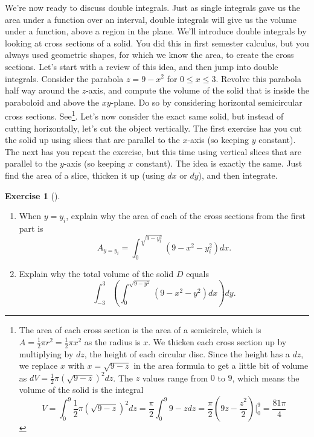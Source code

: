 \documentclass[10pt,]{book}
\theoremstyle{plain}
\theoremstyle{definition}
\theoremstyle{definition}
\theoremstyle{definition}
\theoremstyle{definition}
\newtheorem{exploration}[project]{Exercise}
\theoremstyle{definition}
\numberwithin{equation}{section}
\newcommand{\ds}{\displaystyle}
\begin{document}
We're now ready to discuss double integrals. Just as single integrals gave us the area under a function over an interval, double integrals will give us the volume under a function, above a region in the plane. We'll introduce double integrals by looking at cross sections of a solid. You did this in first semester calculus, but you always used geometric shapes, for which we know the area, to create the cross sections. Let's start with a review of this idea, and then jump into double integrals.%
Consider the parabola \(z=9-x^2\) for \(0\leq x\leq 3\). Revolve this parabola half way around the \(z\)-axis, and compute the volume of the solid that is inside the paraboloid and above the \(xy\)-plane. Do so by considering horizontal semicircular cross sections. See\footnote{The area of each cross section is the area of a semicircle, which is \(A=\frac{1}{2}\pi r^2 = \frac12 \pi x^2\) as the radius is \(x\). We thicken each cross section up by multiplying by \(dz\), the height of each circular disc. Since the height has a \(dz\), we replace \(x\) with \(x=\sqrt{9-z}\) in the area formula to get a little bit of volume as \(dV = \frac{1}{2}\pi (\sqrt{9-z})^2 dz\).  The \(z\) values range from \(0\) to \(9\), which means the volume of the solid is the integral%
\begin{equation*}
V
=\int_0^9 \frac{1}{2}\pi (\sqrt{9-z})^2 dz
=\frac{\pi}{2}\int_0^9  9-z dz
=\frac{\pi}{2}  \left(9z-\frac{z^2}{2}\right)\bigg|_0^9
=\frac{81\pi}{4}
\end{equation*}
\label{fn-23}}.%
Let's now consider the exact same solid, but instead of cutting horizontally, let's cut the object vertically. The first exercise has you cut the solid up using slices that are parallel to the \(x\)-axis (so keeping \(y\) constant). The next has you repeat the exercise, but this time using vertical slices that are parallel to the \(y\)-axis (so keeping \(x\) constant). The idea is exactly the same. Just find the area of a slice, thicken it up (using \(dx\) or \(dy\)), and then integrate.%
\begin{exploration}[]\label{prob_double-int_half_parabolic}
\leavevmode%
\begin{enumerate}[font=\bfseries,label=(\alph*),ref=\alph*]
\item\label{task-666} When \(y=y_i\), explain why the area of each of the cross sections from the first part is%
\begin{equation*}
A_{y=y_i}=\ds \int_0^{\sqrt{9-y_i^2}} (9-x^2-y_i^2) dx.
\end{equation*}
%
\item\label{task-667} Explain why the total volume of the solid \(D\) equals%
\begin{equation*}
\ds\int_{-3}^{3} \left(\int_0^{\sqrt{9-y^2}}(9-x^2-y^2) dx\right) dy.
\end{equation*}
%
\end{enumerate}
\end{exploration}
\end{document}
